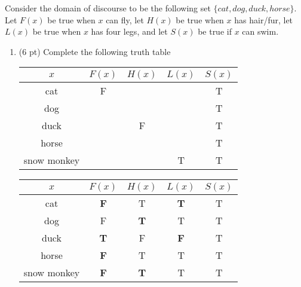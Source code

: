 \begin{questions}


  Consider the domain of discourse to be the following set $ \{ cat, dog, duck, horse \}$.  Let $F(x)$ be true when $x$ can fly, let $H(x)$ be true when $x$ has hair/fur, let $L(x)$ be true when $x$ has four legs, and let $S(x)$ be true if $x$ can swim. 

\begin{enumerate}[label=(\alph*)]
  \item (6 pt) Complete the following truth table

  \hspace*{0.5in}\begin{tabular}{|c|c|c|c|c|}
    \hline
      $x$ & $F(x)$ & $H(x)$ & $L(x)$ & \hspace*{0.1in}$S(x)$ \hspace*{0.1in}\\
    \hline
      cat   &  F & \hspace*{0.5in} & \hspace*{0.5in} & T \\
    \hline
      dog   & \hspace*{0.5in}  & & & T \\
    \hline
      duck  &  & F & & T \\
    \hline
      horse &  & &  & T \\
    \hline
      snow monkey &  & & T & T \\
    \hline
  \end{tabular}
    \begin{solution}
      \begin{tabular}{|c|c|c|c|c|}
        \hline
          $x$ & $F(x)$ & $H(x)$ & $L(x)$ & \hspace*{0.15in} $S(x)$ \hspace*{0.15in} \\
        \hline
          cat   & \textbf{F} & T & \textbf{T} & T \\
        \hline
          dog   & F & \textbf{T} & T & T \\
        \hline
          duck  & \textbf{T} & F & \textbf{F} & T \\
        \hline
          horse & \textbf{F} & T & T & T \\
        \hline
          snow monkey & \textbf{F} & \textbf{T} & T & T \\
        \hline
      \end{tabular}
    \end{solution}


\end{enumerate}
\end{questions}
